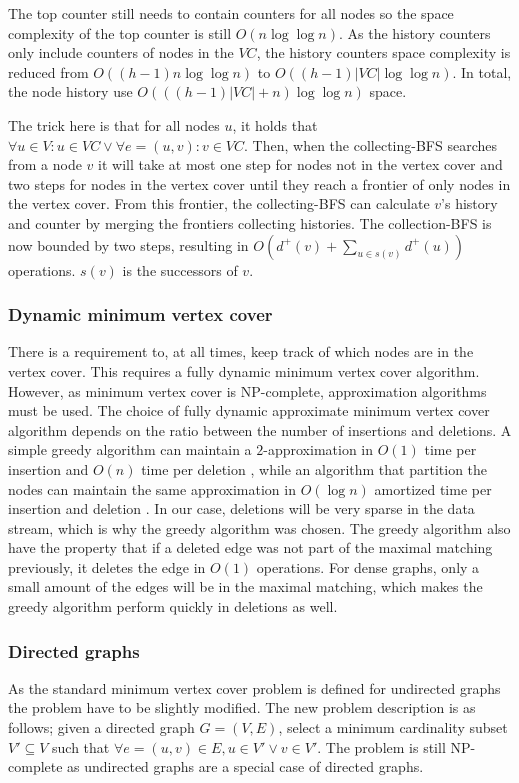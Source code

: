 The top counter still needs to contain counters for all nodes so the space complexity of the top counter is still $O(n\log \log n)$. As the history counters only include counters of nodes in the $VC$, the history counters space complexity is reduced from $O((h-1)n \log \log n)$ to $O((h-1)|VC| \log \log n)$. In total, the node history use $O(((h-1)|VC| + n )\log \log n)$ space.

The trick here is that for all nodes $u$, it holds that $\forall u \in V: u \in VC \vee \forall e = (u,v) : v \in VC$. Then, when the collecting-BFS searches from a node $v$ it will take at most one step for nodes not in the vertex cover and two steps for nodes in the vertex cover until they reach a frontier of only nodes in the vertex cover. From this frontier, the collecting-BFS can calculate $v$'s history and counter by merging the frontiers collecting histories. The collection-BFS is now bounded by two steps, resulting in $O(d^+(v) + \sum_{u \in s(v)}{d^+(u)})$ operations. $s(v)$ is the successors of $v$.

\subsubsection{Dynamic minimum vertex cover}
There is a requirement to, at all times, keep track of which nodes are in the vertex cover. This requires a fully dynamic minimum vertex cover algorithm. However, as minimum vertex cover is NP-complete, approximation algorithms must be used. The choice of fully dynamic approximate minimum vertex cover algorithm depends on the ratio between the number of insertions and deletions. A simple greedy algorithm can maintain a $2$-approximation in $O(1)$ time per insertion and $O(n)$ time per deletion \cite{2appdynvc}, while an algorithm that partition the nodes can maintain the same approximation in $O(\log n )$ amortized time per insertion and deletion \cite{2appdynvclogn}. In our case, deletions will be very sparse in the data stream, which is why the greedy algorithm was chosen. The greedy algorithm also have the property that if a deleted edge was not part of the maximal matching previously, it deletes the edge in $O(1)$ operations. For dense graphs, only a small amount of the edges will be in the maximal matching, which makes the greedy algorithm perform quickly in deletions as well. 

 
\subsubsection{Directed graphs}
As the standard minimum vertex cover problem is defined for undirected graphs the problem have to be slightly modified. The new problem description is as follows; given a directed graph $G = (V,E)$, select a minimum cardinality subset $V' \subseteq V$ such that $\forall e = (u,v) \in E, u \in V' \vee v \in V'$. The problem is still NP-complete as undirected graphs are a special case of directed graphs. 

